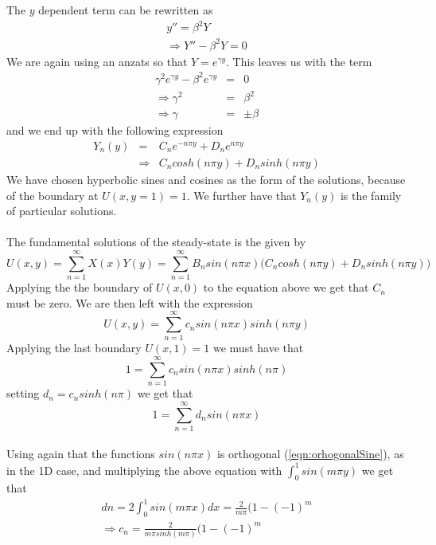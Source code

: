 \documentclass{article}
\begin{document}
The $y$ dependent term can be rewritten as 
\begin{subequations}
\begin{eqnarray}
y'' = \beta^2 Y \\ 
\Rightarrow Y'' - \beta^2 Y = 0 
\end{eqnarray}
\end{subequations}
We are again using an anzats so that $Y = e^{\gamma y}$. This leaves us with the term
\begin{subequations}
\begin{eqnarray}
\gamma^2 e^{\gamma y} - \beta^2 e^{\gamma y} &=& 0 \\ 
\Rightarrow \gamma^2 &=& \beta^2 \\ 
\Rightarrow \gamma &=& \pm \beta
\end{eqnarray}
\end{subequations}
and we end up with the following expression
\begin{eqnarray}
Y_n(y) &=& C_ne^{-n\pi y} + D_ne^{n\pi y} \\ 
&\Rightarrow & C_ncosh(n\pi y) + D_nsinh(n\pi y)
\end{eqnarray}
We have chosen hyperbolic sines and cosines as the form of the solutions, because of the boundary at $U(x,y=1) = 1$. We further have that {$Y_n(y)$} is the family of particular solutions.
\\
\\
The fundamental solutions of the steady-state is the given by
\begin{equation}
U(x,y) = \sum_{n=1}^{\infty} X(x)Y(y) = \sum_{n=1}^{\infty} B_nsin(n\pi x)\Big(C_ncosh(n\pi y) + D_nsinh(n\pi y)\Big)
\end{equation}
Applying the the boundary of $U(x,0)$ to the equation above we get that $C_n$ must be zero. We are then left with the expression
\begin{equation}
 U(x,y) = \sum_{n=1}^{\infty} c_n sin(n\pi x)sinh(n\pi y)
\label{eqn:UsteadyStatefundamentalSolutions}
\end{equation}
Applying the last boundary $U(x,1) = 1$ we must have that
\begin{equation}
1 = \sum_{n=1}^{\infty} c_n sin(n\pi x)sinh(n\pi)
\end{equation}
setting $d_n = c_nsinh(n\pi)$ we get that 
\begin{equation}
1 = \sum_{n=1}^{\infty} d_n sin(n\pi x)
\end{equation}
\\
Using again that the functions $sin(n\pi x)$ is orthogonal (\ref{eqn:orhogonalSine}), as in the 1D case, and multiplying the above equation with $\int_0^1 sin(m\pi y)$ we get that 
\begin{subequations}
\begin{eqnarray}
dn = 2\int_0^1 sin(m\pi x) dx = \frac{2}{m\pi}(1-(-1)^m\\
\Rightarrow c_n = \frac{2}{m\pi sinh(m\pi)}(1-(-1)^m
\end{eqnarray}
\end{subequations}
\end{document}

